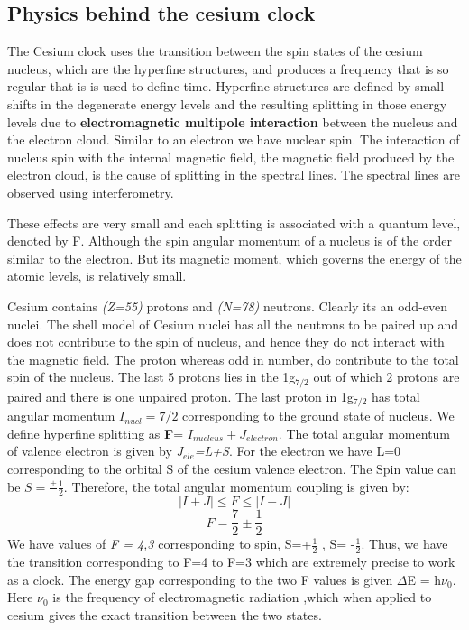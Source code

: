 \documentclass[%
 aapm,
 mph,%
 amsmath,amssymb,
 reprint,%
]{revtex4-2}
\begin{document}
\subsection{Physics behind the cesium clock }
The Cesium clock uses the transition between the spin states of the cesium nucleus, which are the hyperfine structures, and produces a frequency that is so regular that is is used to define time. Hyperfine structures \cite{encyclbritannica} are defined by small shifts in the degenerate energy levels and the resulting splitting in those energy levels due to \textbf{electromagnetic multipole interaction} between the nucleus and the electron cloud. Similar to an electron we have nuclear spin. The interaction of nucleus spin with the internal magnetic field, the magnetic field produced by the electron cloud, is the cause of splitting in the spectral lines. The spectral lines are observed using interferometry. 

These effects are very small and each splitting is associated with a quantum level, denoted by F. Although the spin angular momentum of a nucleus is of the order similar to the electron. But its magnetic moment, which governs the energy of the atomic levels, is relatively small. 


 Cesium contains \emph{(Z=55)} protons and \emph{(N=78)} neutrons. Clearly its an odd-even nuclei. The shell model \cite{povh2012particles} of Cesium nuclei has all the neutrons to be paired up and does not contribute to the spin of nucleus, and hence they do not interact with the magnetic field. The proton whereas odd in number, do contribute to the total spin of the nucleus. The last 5 protons lies in the 1g$_{7/2}$ out of which 2 protons are paired and there is one unpaired proton. The last proton in 1g$_{7/2}$ has total angular momentum $I_{nucl}  = 7/2$ corresponding to the ground state of nucleus. We define hyperfine splitting as \textbf{F}= 
 $I_{nucleus} + J_{electron}$. The total angular momentum of valence electron is given by \emph{J$_{ele}$=L+S}. For the electron we have L=0 corresponding to the orbital S of the cesium valence electron. The Spin value can be $S = \frac{+}{} \frac{1}{2}$. Therefore, the total angular momentum coupling is given by:
\begin{equation}
    |I + J| \le F \le |I- J| 
\end{equation}
\begin{equation}
    F =  \frac{7}{2} \pm \frac{1}{2}
\end{equation}
We have values of \emph{F = 4,3} corresponding to spin, S=+$\frac{1}{2}$ , S= -$\frac{1}{2}$. Thus, we have the transition corresponding to F=4 to F=3 which are extremely precise to work as a clock. The energy gap corresponding to the two F values is given $\Delta$E = h$\nu_0$. Here $\nu_0$ is the frequency of electromagnetic radiation ,which when applied to cesium gives the exact transition between the two states. 
\end{document}
